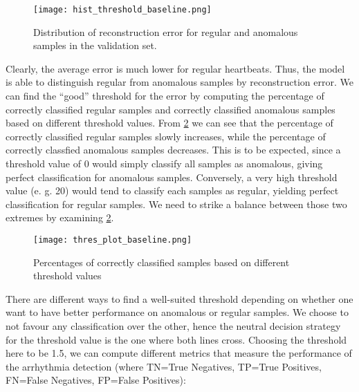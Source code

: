 \begin{figure}[H]
    \centering
    \texttt{[image: hist\_threshold\_baseline.png]}
    \caption{Distribution of reconstruction error for regular and anomalous samples in the validation set.}\label{fig:distr_err_baseline}
\end{figure}
Clearly, the average error is much lower for regular heartbeats. Thus, the model is able to distinguish regular from anomalous samples by reconstruction error. We can find the ``good'' threshold for the error by computing the percentage of correctly classified regular samples and correctly classified anomalous samples based on different threshold values. From \cref{fig:thres_baseline} we can see that the percentage of correctly classified regular samples slowly increases, while the percentage of correctly classfied anomalous samples decreases. This is to be expected, since a threshold value of 0 would simply classify all samples as anomalous, giving perfect classification for anomalous samples. Conversely, a very high threshold value (e. g. 20) would tend to classify each samples as regular, yielding perfect classification for regular samples. We need to strike a balance between those two extremes by examining \cref{fig:thres_baseline}.

\begin{figure}[h]
    \centering
    \texttt{[image: thres\_plot\_baseline.png]}
    \caption{Percentages of correctly classified samples based on different threshold values}
    \label{fig:thres_baseline}
\end{figure}

There are different ways to find a well-suited threshold depending on whether one want to have better performance on anomalous or regular samples. We choose to not favour any classification over the other, hence the neutral decision strategy for the threshold value is the one where both lines cross. Choosing the threshold here to be 1.5, we can compute different metrics that measure the performance of the arrhythmia detection (where TN=True Negatives, TP=True Positives, FN=False Negatives, FP=False Positives):

